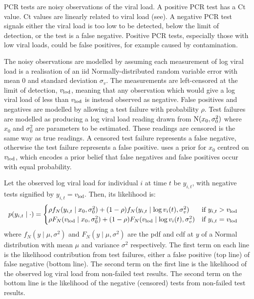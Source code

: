 \documentclass[thesis.tex]{subfiles}
\begin{document}
PCR tests are noisy observations of the viral load.
A positive PCR test has a Ct value.
Ct values are linearly related to viral load (see).
A negative PCR test signals either the viral load is too low to be detected, \ie below the limit of detection, or the test is a false negative.
Positive PCR tests, especially those with low viral loads, could be false positives, for example caused by contamination.

The noisy observations are modelled by assuming each measurement of log viral load is a realisation of an iid Normally-distributed random variable error with mean 0 and standard deviation $\sigma_v$.
The measurements are left-censored at the limit of detection, $v_\text{lod}$, meaning that any observation which would give a log viral load of less than $v_\text{lod}$ is instead observed as negative.
False positives and negatives are modelled by allowing a test failure with probability $\rho$.
Test failures are modelled as producing a log viral load reading drawn from $\operatorname{N}(x_0, \sigma_0^2)$ where $x_0$ and $\sigma_0^2$ are parameters to be estimated.
These readings are censored is the same way as true readings.
A censored test failure represents a false negative, otherwise the test failure represents a false positive.
\textcite{hakkiOnset} uses a prior for $x_0$ centred on $v_\text{lod}$, which encodes a prior belief that false negatives and false positives occur with equal probability.

Let the observed log viral load for individual $i$ at time $t$ be $y_{i,t}$, with negative tests signified by $y_{i,t}=v_\text{lod}$.
Then, its likelihood is:
\begin{align}
p(y_{i,t} \mid \cdot) &= \begin{cases}
    \rho f_N(y_{i,t} \mid x_0, \sigma_0^2) + (1 - \rho) f_N(y_{i,t} \mid \log v_i(t), \sigma_v^2) & \text{if $y_{i,t} > v_\text{lod}$}\\
    \rho F_N(v_\text{lod} \mid x_0, \sigma_0^2) + (1 - \rho) F_N(v_\text{lod} \mid \log v_i(t), \sigma_v^2) & \text{if $y_{i,t} = v_\text{lod}$} \label{ATACCC:eq:hakki-likelihood}
\end{cases}
\end{align}
where $f_N(y \mid \mu, \sigma^2)$ and $F_N(y \mid \mu, \sigma^2)$ are the pdf and cdf at $y$ of a Normal distribution with mean $\mu$ and variance $\sigma^2$ respectively.
The first term on each line is the likelihood contribution from test failures, either a false positive (top line) of false negative (bottom line).
The second term on the first line is the likelihood of the observed log viral load from non-failed test results.
The second term on the bottom line is the likelihood of the negative (censored) tests from non-failed test results.
\end{document}
